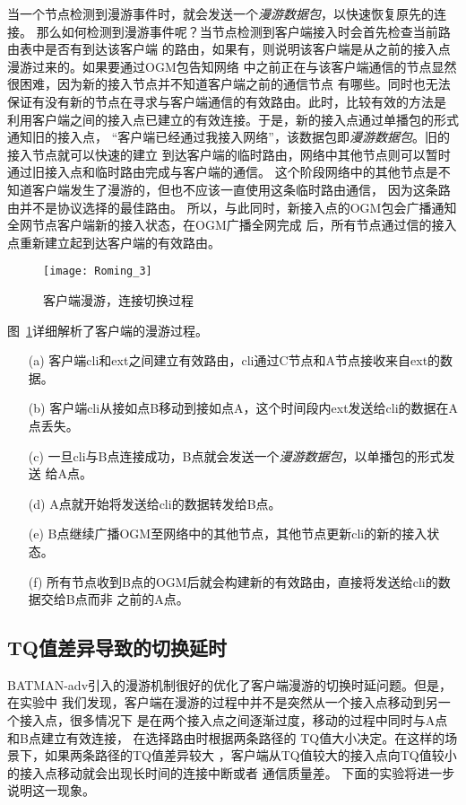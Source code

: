 当一个节点检测到漫游事件时，就会发送一个\emph{漫游数据包}，以快速恢复原先的连接。
那么如何检测到漫游事件呢？当节点检测到客户端接入时会首先检查当前路由表中是否有到达该客户端
的路由，如果有，则说明该客户端是从之前的接入点漫游过来的。如果要通过OGM包告知网络
中之前正在与该客户端通信的节点显然很困难，因为新的接入节点并不知道客户端之前的通信节点
有哪些。同时也无法保证有没有新的节点在寻求与客户端通信的有效路由。此时，比较有效的方法是
利用客户端之间的接入点已建立的有效连接。于是，新的接入点通过单播包的形式通知旧的接入点，
“客户端已经通过我接入网络”，该数据包即\emph{漫游数据包}。旧的接入节点就可以快速的建立
到达客户端的临时路由，网络中其他节点则可以暂时通过旧接入点和临时路由完成与客户端的通信。
这个阶段网络中的其他节点是不知道客户端发生了漫游的，但也不应该一直使用这条临时路由通信，
因为这条路由并不是协议选择的最佳路由。
所以，与此同时，新接入点的OGM包会广播通知全网节点客户端新的接入状态，在OGM广播全网完成
后，所有节点通过信的接入点重新建立起到达客户端的有效路由。

\begin{figure}[H] %
  \centering
  \texttt{[image: Roming\_3]}
  \caption{客户端漫游，连接切换过程}
  \label{fig:roming_3}
\end{figure}

图~\ref{fig:roming_3}详细解析了客户端的漫游过程。
\begin{itemize}
\item[(a)] 客户端cli和ext之间建立有效路由，cli通过C节点和A节点接收来自ext的数据。
\item[(b)] 客户端cli从接如点B移动到接如点A，这个时间段内ext发送给cli的数据在A点丢失。
\item[(c)] 一旦cli与B点连接成功，B点就会发送一个\emph{漫游数据包}，以单播包的形式发送
给A点。
\item[(d)] A点就开始将发送给cli的数据转发给B点。
\item[(e)] B点继续广播OGM至网络中的其他节点，其他节点更新cli的新的接入状态。
\item[(f)] 所有节点收到B点的OGM后就会构建新的有效路由，直接将发送给cli的数据交给B点而非
之前的A点。
\end{itemize}

\subsection{TQ值差异导致的切换延时}
BATMAN-adv引入的漫游机制很好的优化了客户端漫游的切换时延问题。但是，在实验中
我们发现，客户端在漫游的过程中并不是突然从一个接入点移动到另一个接入点，很多情况下
是在两个接入点之间逐渐过度，移动的过程中同时与A点和B点建立有效连接，
在选择路由时根据两条路径的
TQ值大小决定。在这样的场景下，如果两条路径的TQ值差异较大
，客户端从TQ值较大的接入点向TQ值较小的接入点移动就会出现长时间的连接中断或者
通信质量差。
下面的实验将进一步说明这一现象。

